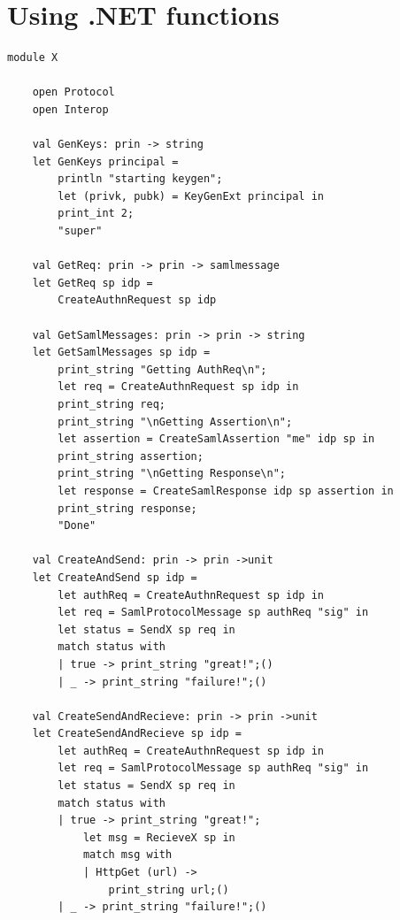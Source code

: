 \documentclass[twosided]{report}
\begin{document}
\section{Using .NET functions}
\begin{lstlisting}[style=fstar, caption={Example of how use types from .NET \cite{jacob}.}]
	module X

	open Protocol
	open Interop
	
	val GenKeys: prin -> string
	let GenKeys principal = 
		println "starting keygen";
		let (privk, pubk) = KeyGenExt principal in
		print_int 2;
		"super"
	
	val GetReq: prin -> prin -> samlmessage
	let GetReq sp idp = 
		CreateAuthnRequest sp idp
		
	val GetSamlMessages: prin -> prin -> string
	let GetSamlMessages sp idp = 
		print_string "Getting AuthReq\n";
		let req = CreateAuthnRequest sp idp in
		print_string req;
		print_string "\nGetting Assertion\n";
		let assertion = CreateSamlAssertion "me" idp sp in
		print_string assertion;
		print_string "\nGetting Response\n";
		let response = CreateSamlResponse idp sp assertion in
		print_string response;
		"Done"
	
	val CreateAndSend: prin -> prin ->unit
	let CreateAndSend sp idp =
		let authReq = CreateAuthnRequest sp idp in
		let req = SamlProtocolMessage sp authReq "sig" in
		let status = SendX sp req in
		match status with
		| true -> print_string "great!";()
		| _ -> print_string "failure!";()
	
	val CreateSendAndRecieve: prin -> prin ->unit
	let CreateSendAndRecieve sp idp =
		let authReq = CreateAuthnRequest sp idp in
		let req = SamlProtocolMessage sp authReq "sig" in
		let status = SendX sp req in
		match status with
		| true -> print_string "great!";
			let msg = RecieveX sp in
			match msg with
			| HttpGet (url) -> 
				print_string url;()
		| _ -> print_string "failure!";()
\end{lstlisting}
\clearpage
\end{document}
